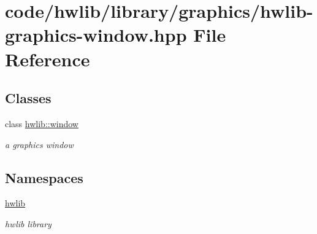 \hypertarget{hwlib-graphics-window_8hpp}{}\section{code/hwlib/library/graphics/hwlib-\/graphics-\/window.hpp File Reference}
\label{hwlib-graphics-window_8hpp}
\subsection*{Classes}
\begin{DoxyCompactItemize}
\item 
class \hyperlink{classhwlib_1_1window}{hwlib\+::window}
\begin{DoxyCompactList}\small\item\em a graphics window \end{DoxyCompactList}\end{DoxyCompactItemize}
\subsection*{Namespaces}
\begin{DoxyCompactItemize}
\item 
 \hyperlink{namespacehwlib}{hwlib}
\begin{DoxyCompactList}\small\item\em hwlib library \end{DoxyCompactList}\end{DoxyCompactItemize}
